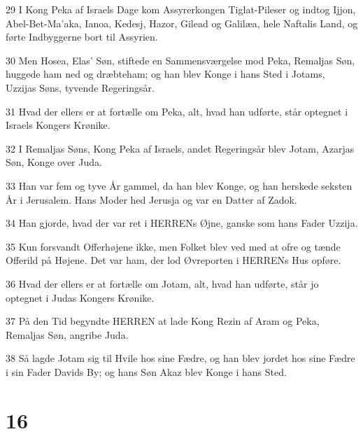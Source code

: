 \par 29 I Kong Peka af Israels Dage kom Assyrerkongen Tiglat-Pileser og indtog Ijjon, Abel-Bet-Ma'aka, Ianoa, Kedesj, Hazor, Gilead og Galilæa, hele Naftalis Land, og førte Indbyggerne bort til Assyrien.
\par 30 Men Hosea, Elas' Søn, stiftede en Sammensværgelse mod Peka, Remaljas Søn, huggede ham ned og dræbteham; og han blev Konge i hans Sted i Jotams, Uzzijas Søns, tyvende Regeringsår.
\par 31 Hvad der ellers er at fortælle om Peka, alt, hvad han udførte, står optegnet i Israels Kongers Krønike.
\par 32 I Remaljas Søns, Kong Peka af Israels, andet Regeringsår blev Jotam, Azarjas Søn, Konge over Juda.
\par 33 Han var fem og tyve År gammel, da han blev Konge, og han herskede seksten År i Jerusalem. Hans Moder hed Jerusja og var en Datter af Zadok.
\par 34 Han gjorde, hvad der var ret i HERRENs Øjne, ganske som hans Fader Uzzija.
\par 35 Kun forsvandt Offerhøjene ikke, men Folket blev ved med at ofre og tænde Offerild på Højene. Det var ham, der lod Øvreporten i HERRENs Hus opføre.
\par 36 Hvad der ellers er at fortælle om Jotam, alt, hvad han udførte, står jo optegnet i Judas Kongers Krønike.
\par 37 På den Tid begyndte HERREN at lade Kong Rezin af Aram og Peka, Remaljas Søn, angribe Juda.
\par 38 Så lagde Jotam sig til Hvile hos sine Fædre, og han blev jordet hos sine Fædre i sin Fader Davids By; og hans Søn Akaz blev Konge i hans Sted.

\chapter{16}

